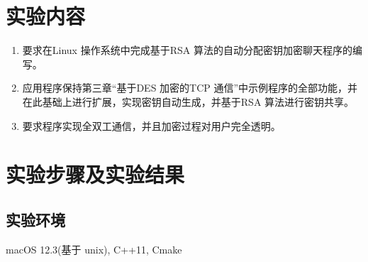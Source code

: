 \documentclass[UTF8,a4paper,10pt]{ctexart}
\begin{document}
\section{实验内容}
\begin{enumerate}
  \item 要求在Linux 操作系统中完成基于RSA 算法的自动分配密钥加密聊天程序的编写。
  \item 应用程序保持第三章“基于DES 加密的TCP 通信”中示例程序的全部功能，并在此基础上进行扩展，实现密钥自动生成，并基于RSA 算法进行密钥共享。
  \item 要求程序实现全双工通信，并且加密过程对用户完全透明。
\end{enumerate}
\section{实验步骤及实验结果}
\subsection{实验环境}
\noindent macOS 12.3(基于 unix), C++11, Cmake\
\end{document}
